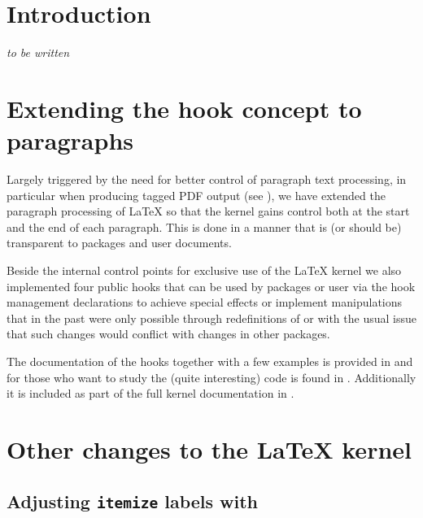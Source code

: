 \documentclass{ltnews}
\providecommand\env[1]{\texttt{#1}}
\providecommand\env[1]{\texttt{#1}}
\providecommand\tubcommand[1]{}
\begin{document}
\tubcommand{\addtolength\textheight{4.2pc}}   %

\maketitle
{ \spaceskip=3.33pt  \tableofcontents}

\setlength{}


\medskip


\section{Introduction}

\emph{to be written}




\section{Extending the hook concept to paragraphs}

Largely triggered by the need for better control of paragraph text
processing, in particular when producing tagged PDF output (see
\cite{33:blueprint}), we have extended the paragraph processing of
\LaTeX{} so that the kernel gains control both at the start and the
end of each paragraph. This is done in a manner that is (or should
be) transparent to packages and user documents.

Beside the internal control points for exclusive use of the \LaTeX{}
kernel we also implemented four public hooks that can be used by
packages or user via the hook management declarations to achieve
special effects or implement manipulations that in the past were only
possible through redefinitions of  or  with the
usual issue that such changes would conflict with changes in other
packages.

The documentation of the hooks together with a few examples is
provided in  and for those who want to study the
(quite interesting) code is found in
. Additionally it is included as part of the
full kernel documentation in .



\section{Other changes to the \LaTeX{} kernel}

\subsection{Adjusting \env{itemize} labels with }
\end{document}
